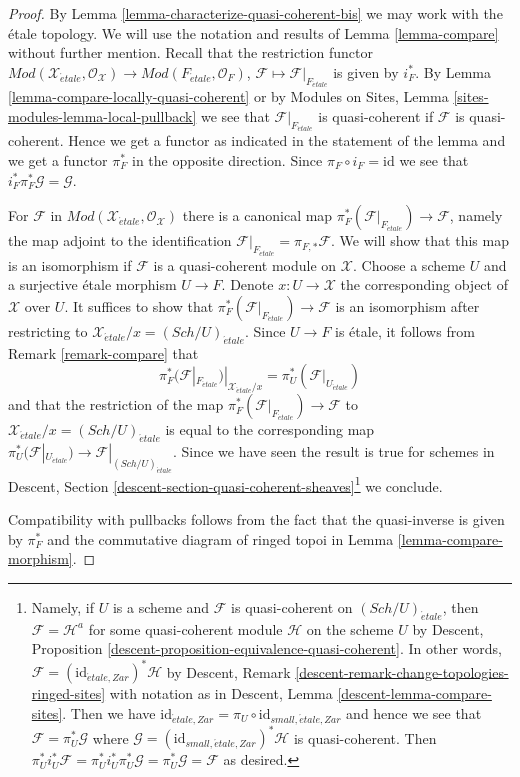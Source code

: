 \documentclass[10pt,a4paper]{amsart}
\theoremstyle{plain}
\theoremstyle{definition}
\theoremstyle{remark}
\numberwithin{equation}{subsection}
\def\Sch{\mathit{Sch}}
\def\etale{{\acute{e}tale}}
\begin{document}
\begin{proof}
By Lemma \ref{lemma-characterize-quasi-coherent-bis} we may work with
the \'etale topology. We will use the notation and results of
Lemma \ref{lemma-compare} without further mention.
Recall that the restriction functor
$\textit{Mod}(\mathcal{X}_\etale, \mathcal{O}_\mathcal{X}) \to
\textit{Mod}(F_\etale, \mathcal{O}_F)$,
$\mathcal{F} \mapsto \mathcal{F}|_{F_\etale}$ is given by $i_F^*$. By
Lemma \ref{lemma-compare-locally-quasi-coherent} or by
Modules on Sites, Lemma \ref{sites-modules-lemma-local-pullback}
we see that $\mathcal{F}|_{F_\etale}$ is quasi-coherent if
$\mathcal{F}$ is quasi-coherent.
Hence we get a functor as indicated in the statement of the
lemma and we get a functor $\pi_F^*$ in the opposite direction.
Since $\pi_F \circ i_F = \text{id}$ we see that
$i_F^*\pi_F^*\mathcal{G} = \mathcal{G}$.

\medskip\noindent
For $\mathcal{F}$ in
$\textit{Mod}(\mathcal{X}_\etale, \mathcal{O}_\mathcal{X})$
there is a canonical map $\pi_F^*(\mathcal{F}|_{F_\etale}) \to \mathcal{F}$,
namely the map adjoint to the identification
$\mathcal{F}|_{F_\etale} = \pi_{F, *}\mathcal{F}$.
We will show that this map is an isomorphism if $\mathcal{F}$ is
a quasi-coherent module on $\mathcal{X}$.
Choose a scheme $U$ and a surjective \'etale morphism $U \to F$.
Denote $x : U \to \mathcal{X}$ the corresponding object of $\mathcal{X}$
over $U$. It suffices to show that
$\pi_F^*(\mathcal{F}|_{F_\etale}) \to \mathcal{F}$ is an isomorphism
after restricting to $\mathcal{X}_\etale/x = (\Sch/U)_\etale$.
Since $U \to F$ is \'etale, it follows from Remark \ref{remark-compare} that
$$
\pi_F^*(\mathcal{F}|_{F_\etale})|_{\mathcal{X}_\etale/x} =
\pi_U^*(\mathcal{F}|_{U_\etale})
$$
and that the restriction of the map
$\pi_F^*(\mathcal{F}|_{F_\etale}) \to \mathcal{F}$
to $\mathcal{X}_\etale/x = (\Sch/U)_\etale$
is equal to the corresponding map
$\pi_U^*(\mathcal{F}|_{U_\etale}) \to \mathcal{F}|_{(\Sch/U)_\etale}$.
Since we have seen the result is true for schemes in
Descent, Section \ref{descent-section-quasi-coherent-sheaves}\footnote{Namely,
if $U$ is a scheme and $\mathcal{F}$ is quasi-coherent on
$(\Sch/U)_\etale$, then $\mathcal{F} = \mathcal{H}^a$ for some
quasi-coherent module $\mathcal{H}$ on the scheme $U$ by
Descent, Proposition \ref{descent-proposition-equivalence-quasi-coherent}.
In other words, $\mathcal{F} = (\text{id}_{\etale,Zar})^*\mathcal{H}$
by Descent, Remark \ref{descent-remark-change-topologies-ringed-sites}
with notation as in Descent, Lemma \ref{descent-lemma-compare-sites}.
Then we have
$\text{id}_{\etale,Zar} = \pi_U \circ \text{id}_{small,\etale,Zar}$
and hence we see that $\mathcal{F} = \pi_U^*\mathcal{G}$ where
$\mathcal{G} = (\text{id}_{small,\etale,Zar})^*\mathcal{H}$ is
quasi-coherent. Then
$\pi_U^*i_U^*\mathcal{F} = \pi_U^*i_U^*\pi_U^*\mathcal{G} =
\pi_U^*\mathcal{G} = \mathcal{F}$ as desired.}
we conclude.

\medskip\noindent
Compatibility with pullbacks follows from the fact that
the quasi-inverse is given by $\pi_F^*$ and the
commutative diagram of ringed topoi in
Lemma \ref{lemma-compare-morphism}.
\end{proof}
\end{document}
